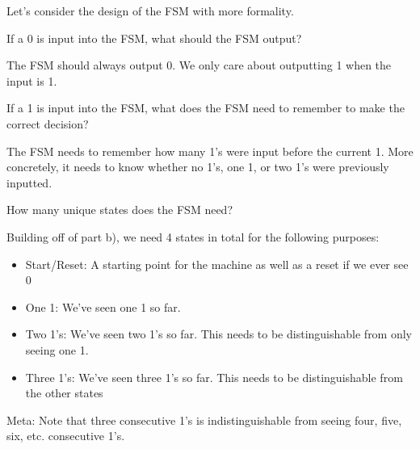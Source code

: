 \begin{blocksection}
\question
Let’s consider the design of the FSM with more formality.

\begin{parts}
\item
If a 0 is input into the FSM, what should the FSM output?
\begin{solution}[0.3in]
The FSM should always output 0. We only care about outputting 1 when the input is 1.
\end{solution}

\item
If a 1 is input into the FSM, what does the FSM need to remember to make the correct decision?
\begin{solution}[0.3in]
The FSM needs to remember how many 1’s were input before the current 1. More concretely, it needs to know whether no 1’s, one 1, or two 1’s were previously inputted.
\end{solution}

\item
How many unique states does the FSM need?
\begin{solution}
Building off of part b), we need 4 states in total for the following purposes:
\begin{itemize}
\item Start/Reset: A starting point for the machine as well as a reset if we ever see 0
\item One 1: We’ve seen one 1 so far.
\item Two 1’s: We’ve seen two 1’s so far. This needs to be distinguishable from only seeing one 1.
\item Three 1’s: We’ve seen three 1’s so far. This needs to be distinguishable from the other states
\end{itemize}
Meta: Note that three consecutive 1’s is indistinguishable from seeing four, five, six, etc. consecutive 1’s.
\end{solution}
\end{parts}
\end{blocksection}